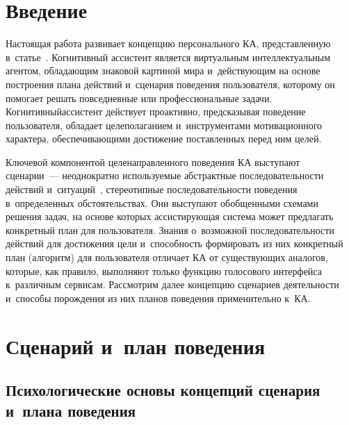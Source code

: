\begin{multicols}{2}

\label{st\stat}
  
\section{Введение}

  Настоящая работа развивает концепцию персонального КА, 
  представленную в~статье~\cite{1-sm}. 
  Когнитивный ассистент 
является виртуальным интеллектуальным агентом, обладающим знаковой 
\mbox{картиной} мира и~действующим на основе по\-стро\-ения плана действий 
и~сценария поведения пользователя, которому он помогает решать 
повседневные или профессиональные задачи. 
%
Когнитивный\linebreak ас\-сис\-тент 
действует проактивно, предсказывая поведение пользователя, обладает 
целеполаганием и~инструментами мотивационного характера, 
обес\-пе\-чи\-ва\-ющи\-ми достижение поставленных перед ним целей. 
  
  Ключевой компонентой целенаправленного поведения КА
   выступают сценарии~--- неоднократно используемые абстрактные 
последовательности действий и~ситуаций~\cite{2-sm, 3-sm}, стереотипные 
последовательности поведения в~определенных обстоятельствах. Они 
выступают обобщенными схемами решения задач, на основе которых 
ассистирующая система может предлагать конкретный план для пользователя. 
%
Знания о~возможной последовательности действий для достижения цели 
и~способность формировать из них конкретный план (алгоритм) для 
пользователя отличает КА от существующих аналогов, 
которые, как правило, выполняют только функцию голосового интерфейса 
к~различным сервисам. 
Рассмотрим далее концепцию сценариев деятельности 
и~способы порождения из них планов поведения применительно 
к~КА.

\vspace*{-9pt}

\section{Сценарий и~план поведения}

\vspace*{-2pt}

\subsection{Психологические основы концепций сценария и~плана
поведения}


\end{multicols}
